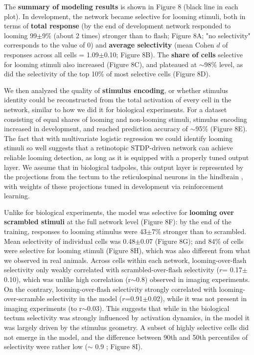 \documentclass{article}
\begin{document}
The \textbf{summary of modeling results} is shown in Figure 8 (black line in each plot). In development, the network became selective for looming stimuli, both in terms of \textbf{total response} (by the end of development network responded to looming 99$\pm$9\% (about 2 times) stronger than to flash; Figure 8A; "no selectivity" corresponds to the value of 0) and \textbf{average selectivity} (mean Cohen $d$ of responses across all cells = 1.09$\pm$0.10; Figure 8B). The \textbf{share of cells} selective for looming stimuli also increased (Figure 8C), and plateaued at $\sim$98\% level, as did the selectivity of the top 10\% of most selective cells (Figure 8D).

We then analyzed the quality of \textbf{stimulus encoding}, or whether stimulus identity could be reconstructed from the total activation of every cell in the network, similar to how we did it for biological experiments. For a dataset consisting of equal shares of looming and non-looming stimuli, stimulus encoding increased in development, and reached prediction accuracy of $\sim$95\% (Figure 8E). The fact that with multivariate logistic regression we could identify looming stimuli so well suggests that a retinotopic STDP-driven network can achieve reliable looming detection, as long as it is equipped with a properly tuned output layer. We assume that in biological tadpoles, this output layer is represented by the projections from the tectum to the reticulospinal neurons in the hindbrain \citep{helmbrecht2018topography}, with weights of these projections tuned in development via reinforcement learning.

Unlike for biological experiments, the model was selective for \textbf{looming over scrambled stimuli} at the full network level (Figure 8F): by the end of the training, responses to looming stimulus were 43$\pm$7\% stronger than to scrambled. Mean selectivity of individual cells was 0.48$\pm$0.07 (Figure 8G); and 84\% of cells were selective for looming stimuli (Figure 8H), which was also different from what we observed in real animals. Across cells within each network, looming-over-flash selectivity only weakly correlated with scrambled-over-flash selectivity ($r$= 0.17$\pm$0.10), which was unlike high correlation (r$\sim$0.8) observed in imaging experiments. On the contrary, looming-over-flash selectivity strongly correlated with looming-over-scramble selectivity in the model ($r$=0.91$\pm$0.02), while it was not present in imaging experiments (to r$\sim$0.03). This suggests that while in the biological tectum selectivity was strongly influenced by activation dynamics, in the model it was largely driven by the stimulus geometry. A subset of highly selective cells did not emerge in the model, and the difference between 90th and 50th percentiles of selectivity were rather low ($\sim$ 0.9 ; Figure 8I).
\end{document}
